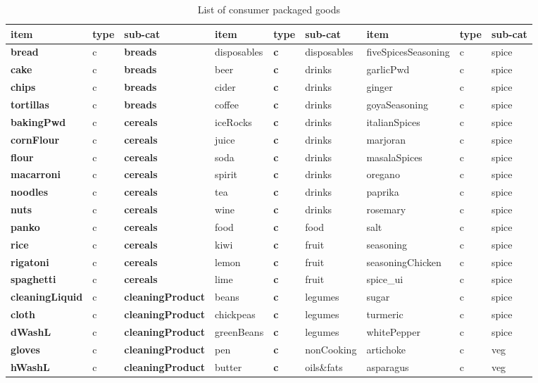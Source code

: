 \documentclass[]{article}
\begin{document}
\begin{table}

\caption{\label{tab:unnamed-chunk-6}List of consumer packaged goods}
\centering
\begin{tabular}[t]{>{\bfseries}l|l|>{\bfseries}l|l|>{\bfseries}l|l|l|l|l}
\hline
item & type & sub-cat & item & type & sub-cat & item & type & sub-cat\\
\hline
bread & c & breads & disposables & c & disposables & fiveSpicesSeasoning & c & spice\\
\hline
cake & c & breads & beer & c & drinks & garlicPwd & c & spice\\
\hline
chips & c & breads & cider & c & drinks & ginger & c & spice\\
\hline
tortillas & c & breads & coffee & c & drinks & goyaSeasoning & c & spice\\
\hline
bakingPwd & c & cereals & iceRocks & c & drinks & italianSpices & c & spice\\
\hline
cornFlour & c & cereals & juice & c & drinks & marjoran & c & spice\\
\hline
flour & c & cereals & soda & c & drinks & masalaSpices & c & spice\\
\hline
macarroni & c & cereals & spirit & c & drinks & oregano & c & spice\\
\hline
noodles & c & cereals & tea & c & drinks & paprika & c & spice\\
\hline
nuts & c & cereals & wine & c & drinks & rosemary & c & spice\\
\hline
panko & c & cereals & food & c & food & salt & c & spice\\
\hline
rice & c & cereals & kiwi & c & fruit & seasoning & c & spice\\
\hline
rigatoni & c & cereals & lemon & c & fruit & seasoningChicken & c & spice\\
\hline
spaghetti & c & cereals & lime & c & fruit & spice\_ui & c & spice\\
\hline
cleaningLiquid & c & cleaningProduct & beans & c & legumes & sugar & c & spice\\
\hline
cloth & c & cleaningProduct & chickpeas & c & legumes & turmeric & c & spice\\
\hline
dWashL & c & cleaningProduct & greenBeans & c & legumes & whitePepper & c & spice\\
\hline
gloves & c & cleaningProduct & pen & c & nonCooking & artichoke & c & veg\\
\hline
hWashL & c & cleaningProduct & butter & c & oils\&fats & asparagus & c & veg\\

\end{tabular}
\end{table}
\end{document}
